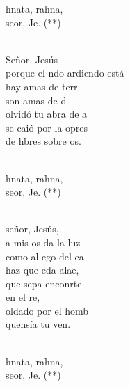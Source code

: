 \documentclass[12pt]{article}
\begin{document}
\begin{multicols*}{2}
\begin{cancion}[Marahnata][Nico]%
	\begin{chorus}%
	hnata, rahna,\\
	 seor, Je. (**)\\
	\end{chorus}%
	\jump\\
	 Señor, Jesús\\
	porque el ndo ardiendo está\\
	hay amas de terr\\
	son amas de d\\
	 olvidó tu abra de a\\
	se caió por la opres\\
	de hbres sobre os.\\\jump\\
	\begin{chorus}%
	hnata, rahna,\\
	 seor, Je. (**)\\
	\end{chorus}%
	\jump\\
	 señor, Jesús,\\
	a mis os da la luz\\
	como al ego del ca\\
	haz que eda alae,\\
	que sepa enconrte\\
	en el re,\\
	oldado por el homb\\
	quensía tu ven.\\\jump\\
	\begin{chorus}%
	hnata, rahna,\\
	 seor, Je. (**)\\
	\end{chorus}%
	\jump\\
\end{cancion}%


\end{multicols*}
\end{document}
